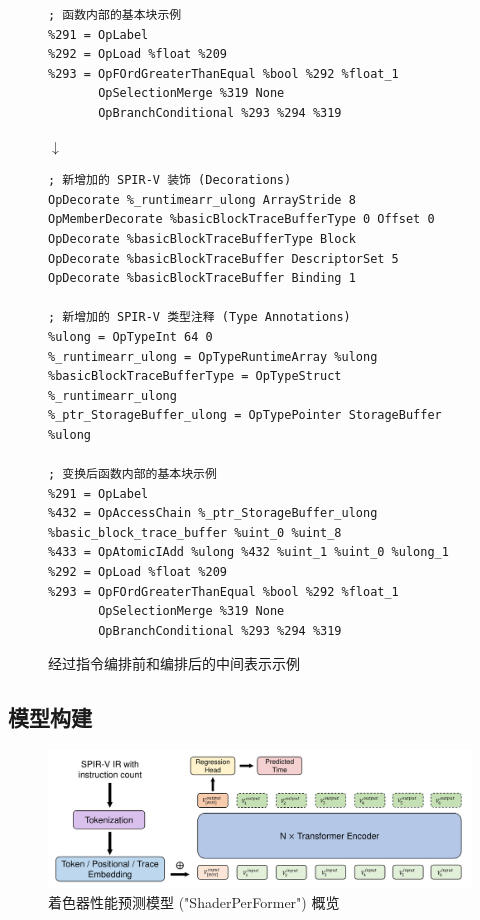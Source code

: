 \begin{figure}  %
\centering
\begin{lstlisting}[language=spirvir]
; 函数内部的基本块示例
%291 = OpLabel
%292 = OpLoad %float %209
%293 = OpFOrdGreaterThanEqual %bool %292 %float_1
       OpSelectionMerge %319 None
       OpBranchConditional %293 %294 %319
\end{lstlisting}
$ \downarrow $
\begin{lstlisting}[language=spirvir]
; 新增加的 SPIR-V 装饰 (Decorations)
OpDecorate %_runtimearr_ulong ArrayStride 8
OpMemberDecorate %basicBlockTraceBufferType 0 Offset 0
OpDecorate %basicBlockTraceBufferType Block
OpDecorate %basicBlockTraceBuffer DescriptorSet 5
OpDecorate %basicBlockTraceBuffer Binding 1

; 新增加的 SPIR-V 类型注释 (Type Annotations)
%ulong = OpTypeInt 64 0
%_runtimearr_ulong = OpTypeRuntimeArray %ulong
%basicBlockTraceBufferType = OpTypeStruct %_runtimearr_ulong
%_ptr_StorageBuffer_ulong = OpTypePointer StorageBuffer %ulong

; 变换后函数内部的基本块示例
%291 = OpLabel
%432 = OpAccessChain %_ptr_StorageBuffer_ulong %basic_block_trace_buffer %uint_0 %uint_8
%433 = OpAtomicIAdd %ulong %432 %uint_1 %uint_0 %ulong_1
%292 = OpLoad %float %209
%293 = OpFOrdGreaterThanEqual %bool %292 %float_1
       OpSelectionMerge %319 None
       OpBranchConditional %293 %294 %319
\end{lstlisting}
\caption{经过指令编排前和编排后的中间表示示例}
\label{fig:modifiedcode}
\end{figure}

\subsection{模型构建}
\label{sec:model_construction}

\begin{figure}[h]
  \centering
  \includegraphics[width=1\linewidth]{figures/ShaderPerFormer(1)_20240103233446.pdf}
  \caption{着色器性能预测模型 ("ShaderPerFormer") 概览}
  \label{fig:spf_overview}
\end{figure}

